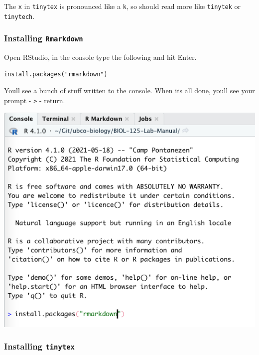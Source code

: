 \documentclass[
]{book}
\begin{document}
The \texttt{x} in \texttt{tinytex} is pronounced like a \texttt{k}, so should read more like \texttt{tinytek} or \texttt{tinytech}.

\hypertarget{installing-rmarkdown}{%
\subsubsection*{\texorpdfstring{Installing \texttt{Rmarkdown}}{Installing Rmarkdown}}\label{installing-rmarkdown}}

Open RStudio, in the console type the following and hit \textquotesingle Enter\textquotesingle.

\begin{verbatim}
install.packages("rmarkdown")
\end{verbatim}

You\textquotesingle ll see a bunch of stuff written to the console. When it\textquotesingle s all done, you\textquotesingle ll see your prompt - \texttt{\textgreater{}} - return.

\includegraphics{images/Install-RMarkdown_20220101.png}

\hypertarget{installing-tinytex}{%
\subsubsection*{\texorpdfstring{Installing \texttt{tinytex}}{Installing tinytex}}\label{installing-tinytex}}
\end{document}
